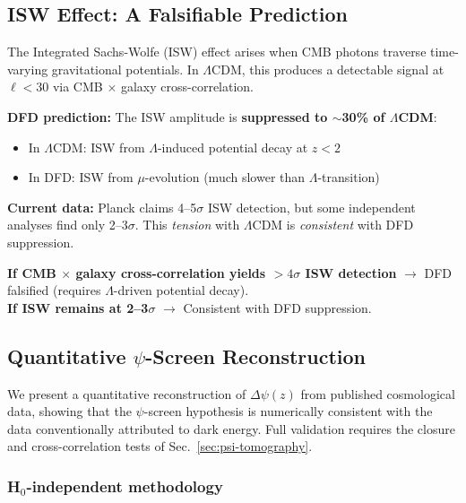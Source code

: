 \subsection{ISW Effect: A Falsifiable Prediction}\label{sec:isw-prediction}

The Integrated Sachs-Wolfe (ISW) effect arises when CMB photons traverse time-varying gravitational potentials. In $\Lambda$CDM, this produces a detectable signal at $\ell < 30$ via CMB $\times$ galaxy cross-correlation.

\textbf{DFD prediction:} The ISW amplitude is \textbf{suppressed to $\sim$30\% of $\Lambda$CDM}:
\begin{itemize}
\item In $\Lambda$CDM: ISW from $\Lambda$-induced potential decay at $z < 2$
\item In DFD: ISW from $\mu$-evolution (much slower than $\Lambda$-transition)
\end{itemize}

\textbf{Current data:} Planck claims 4--5$\sigma$ ISW detection, but some independent analyses find only 2--3$\sigma$. This \textit{tension} with $\Lambda$CDM is \textit{consistent} with DFD suppression.

\begin{tcolorbox}[colback=red!5!white, colframe=red!60!black, title=ISW Falsification Criterion]
\textbf{If CMB $\times$ galaxy cross-correlation yields $>4\sigma$ ISW detection} $\to$ DFD falsified (requires $\Lambda$-driven potential decay).\\
\textbf{If ISW remains at 2--3$\sigma$} $\to$ Consistent with DFD suppression.
\end{tcolorbox}

\subsection{Quantitative $\psi$-Screen Reconstruction}\label{sec:psi-reconstruction}

We present a quantitative reconstruction of $\Delta\psi(z)$ from published cosmological data, showing that the $\psi$-screen hypothesis is numerically consistent with the data conventionally attributed to dark energy.  Full validation requires the closure and cross-correlation tests of Sec.~\ref{sec:psi-tomography}.

\subsubsection{H$_0$-independent methodology}

